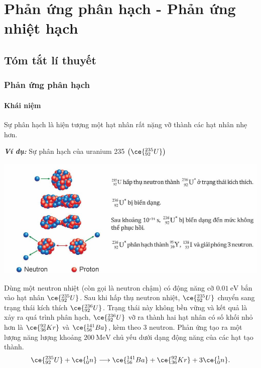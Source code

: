 \section{Phản ứng phân hạch - Phản ứng nhiệt hạch}
\subsection{Tóm tắt lí thuyết}
\begin{tomtat}
	\subsubsection{Phản ứng phân hạch}
	\paragraph{Khái niệm}
\begin{dn}
	Sự phân hạch là hiện tượng một hạt nhân rất nặng vỡ thành các hạt nhân nhẹ hơn.
\end{dn}
	\textbf{\textit{Ví dụ:}} Sự phân hạch của uranium 235 $\left(\ce{^{235}_{92}U}\right)$
	\begin{center}
		\includegraphics[width=0.7\linewidth]{figs/VN12-Y24-PH-SYL-030-1}
	\end{center}
	Dùng một neutron nhiệt (còn gọi là neutron chậm) có động năng cỡ $\SI{0.01}{\electronvolt}$ bắn vào hạt nhân $\ce{^{235}_{92}U}$. Sau khi hấp thụ neutron nhiệt, $\ce{^{235}_{92}U}$ chuyển sang trạng thái kích thích $\ce{^{236}_{92}U}$. Trạng thái này không bền vững và kết quả là xảy ra quá trình phân hạch, $\ce{^{236}_{92}U}$ vỡ ra thành hai hạt nhân có số khối nhỏ hơn là $\ce{^{92}_{36}Kr}$ và $\ce{^{141}_{56}Ba}$, kèm theo 3 neutron. Phản ứng tạo ra một lượng năng lượng khoảng $\SI{200}{\mega\electronvolt}$ chủ yếu dưới dạng động năng của các hạt tạo thành.
	$$\ce{^{235}_{92}U}+\ce{^1_0n}\longrightarrow\ce{^{141}_{56}Ba}+\ce{^{92}_{36}Kr}+3\ce{^1_0n}.$$

\end{tomtat}
